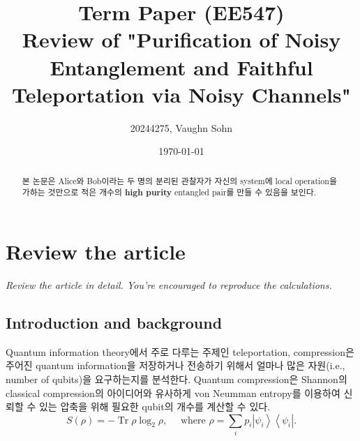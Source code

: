 \documentclass[
]{kaohandt}
\begin{document}

\title[Term paper]{Term Paper (EE547) \\ \large Review of "Purification of Noisy Entanglement and Faithful Teleportation via Noisy Channels"}
\author[SV]{20244275, Vaughn Sohn}
\date{\today}


\maketitle

\margintoc

\begin{abstract}
\noindent
본 논문은 Alice와 Bob이라는 두 명의 분리된 관찰자가 자신의 system에 local operation을 가하는 것만으로 적은 개수의 \textbf{high purity} entangled pair를 만들 수 있음을 보인다.
\end{abstract}


\medskip


\section{Review the article}
\begin{kaobox}
    \textit{Review the article in detail. You're encouraged to reproduce the calculations.}
\end{kaobox}
\subsection{Introduction and background}

Quantum information theory에서 주로 다루는 주제인 teleportation, compression은 주어진 quantum information을 저장하거나 전송하기 위해서 얼마나 많은 자원(i.e., number of qubits)을 요구하는지를 분석한다. 
Quantum compression은 Shannon의 classical compression의 아이디어와 유사하게 von Neumman entropy를 이용하여 신뢰할 수 있는 압축을 위해 필요한 qubit의 개수를 계산할 수 있다. 
\begin{equation}
    S(\rho)=-\operatorname{Tr} \rho \log _2 \rho, \quad \text { where } \rho=\sum_i p_i\left|\psi_i\right\rangle\left\langle\psi_i\right| .
\end{equation}
\end{document}
